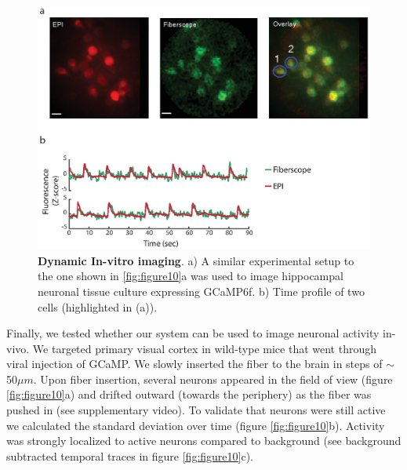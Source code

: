 \documentclass[10pt]{article}
\begin{document}
\begin{figure}
\centering\includegraphics[width=12cm]{figure11}
\caption{\textbf{Dynamic In-vitro imaging}. a) A similar experimental setup to the one shown in \ref{fig:figure10}a was used to image hippocampal neuronal
tissue culture expressing GCaMP6f. b) Time profile of two cells (highlighted in (a)). }
\label{fig:figure11}
\end{figure}

Finally, we tested whether our system can be used to image neuronal activity in-vivo. We targeted primary visual cortex in wild-type mice that went through viral injection of GCaMP. We slowly inserted the fiber to the brain in steps of $\sim$50$\mu m$. Upon fiber insertion, several neurons appeared in the field of view (figure
\ref{fig:figure10}a) and drifted outward (towards the periphery) as the fiber was pushed in (see supplementary video). To validate that neurons were still active we calculated the standard deviation
over time (figure \ref{fig:figure10}b). Activity was strongly localized to active neurons compared to background  (see background subtracted temporal traces in figure \ref{fig:figure10}c). 
\end{document}
